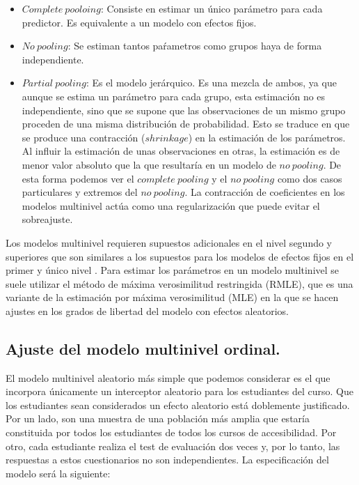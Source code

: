 \documentclass[
  12pt,
  a4paper,
  extrafontsizes,
  onecolumn,
  openright]{memoir}
\providecommand{\tightlist}{%
  \setlength{\itemsep}{0pt}\setlength{\parskip}{0pt}}\usepackage{longtable,booktabs,array}
\begin{document}
\begin{itemize}
\tightlist
\item
  \(Complete\ pooloing\): Consiste en estimar un único parámetro para
  cada predictor. Es equivalente a un modelo con efectos fijos.
\item
  \(No\ pooling\): Se estiman tantos paŕametros como grupos haya de
  forma independiente.
\item
  \(Partial\ pooling\): Es el modelo jerárquico. Es una mezcla de ambos,
  ya que aunque se estima un parámetro para cada grupo, esta estimación
  no es independiente, sino que se supone que las observaciones de un
  mismo grupo proceden de una misma distribución de probabilidad. Esto
  se traduce en que se produce una contracción (\(shrinkage\)) en la
  estimación de los parámetros. Al influir la estimación de unas
  observaciones en otras, la estimación es de menor valor absoluto que
  la que resultaría en un modelo de \(no\ pooling\). De esta forma
  podemos ver el \(complete\ pooling\) y el \(no\ pooling\) como dos
  casos particulares y extremos del \(no\ pooling\). La contracción de
  coeficientes en los modelos multinivel actúa como una regularización
  que puede evitar el sobreajuste.
\end{itemize}

Los modelos multinivel requieren supuestos adicionales en el nivel
segundo y superiores que son similares a los supuestos para los modelos
de efectos fijos en el primer y único nivel
\autocite[ver][pp.~43]{chen2021}. Para estimar los parámetros en un
modelo multinivel se suele utilizar el método de máxima verosimilitud
restringida (RMLE), que es una variante de la estimación por máxima
verosimilitud (MLE) en la que se hacen ajustes en los grados de libertad
del modelo con efectos aleatorios.

\hypertarget{ajuste-del-modelo-multinivel-ordinal.}{%
\subsection{Ajuste del modelo multinivel
ordinal.}\label{ajuste-del-modelo-multinivel-ordinal.}}

El modelo multinivel aleatorio más simple que podemos considerar es el
que incorpora únicamente un interceptor aleatorio para los estudiantes
del curso. Que los estudiantes sean considerados un efecto aleatorio
está doblemente justificado. Por un lado, son una muestra de una
población más amplia que estaría constituida por todos los estudiantes
de todos los cursos de accesibilidad. Por otro, cada estudiante realiza
el test de evaluación dos veces y, por lo tanto, las respuestas a estos
cuestionarios no son independientes. La especificación del modelo será
la siguiente:
\end{document}
